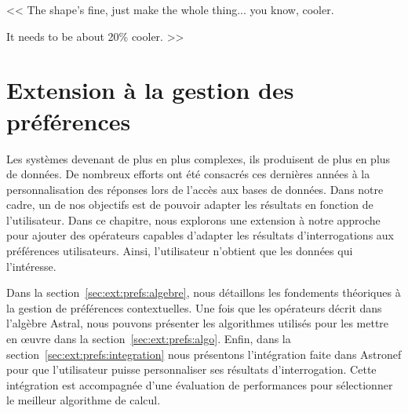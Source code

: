 \begin{savequote}[6cm]
<< The shape's fine, just make the whole thing... you know, cooler. 

\quad It needs to be about 20\% cooler. >>
\end{savequote}
\chapter{Extension à la gestion des préférences}\label{chap:prefs}
\chaptertoc

Les systèmes devenant de plus en plus complexes, ils produisent de plus en plus de données. De nombreux efforts ont été consacrés ces dernières années à la personnalisation des réponses lors de l'accès aux bases de données. Dans notre cadre, un de nos objectifs est de pouvoir adapter les résultats en fonction de l'utilisateur. Dans ce chapitre, nous explorons une extension à notre approche pour ajouter des opérateurs capables d'adapter les résultats d'interrogations aux préférences utilisateurs. Ainsi, l'utilisateur n'obtient que les données qui l'intéresse.

Dans la section~\ref{sec:ext:prefs:algebre}, nous détaillons les fondements théoriques à la gestion de préférences contextuelles. Une fois que les opérateurs décrit dans l'algèbre Astral, nous pouvons présenter les algorithmes utilisés pour les mettre en œuvre dans la section~\ref{sec:ext:prefs:algo}. Enfin, dans la section~\ref{sec:ext:prefs:integration} nous présentons l'intégration faite dans Astronef pour que l'utilisateur puisse personnaliser ses résultats d'interrogation. Cette intégration est accompagnée d'une évaluation de performances pour sélectionner le meilleur algorithme de calcul.






